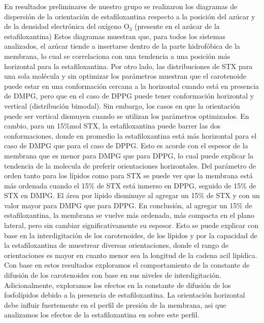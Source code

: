 \documentclass[12pt]{article}
\begin{document}
En resultados preliminares de nuestro grupo se realizaron los diagramas de dispersi\'{o}n de la orientaci\'{o}n de estafiloxantina respecto a la posici\'{o}n del az\'{u}car y de la densidad electr\'{o}nica del ox\'{i}geno $\mathrm{O}_3$ (presente en el az\'{u}car de la estafiloxantina) Estos diagramas muestran que, para todos los sistemas analizados, el az\'{u}car tiende a insertarse dentro de la parte hidrof\'{o}bica de la membrana, lo cual se correlaciona con una tendencia a una posici\'{o}n m\'{a}s horizontal para la estafiloxantina. Por otro lado, las distribuciones de STX para una sola mol\'{e}cula y sin optimizar los par\'{a}metros muestran que el carotenoide puede estar en una conformaci\'{o}n cercana a la horizontal cuando est\'{a} en presencia de DMPG, pero que en el caso de DPPG puede tener conformaci\'{o}n horizontal y vertical (distribuci\'{o}n bimodal). Sin embargo, los casos en que la orientaci\'{o}n puede ser vertical dismuyen cuando se utilizan los par\'{a}metros optimizados. En cambio, para un 15\%mol STX, la estafiloxantina puede barrer las dos conformaciones, donde en promedio la estafiloxantina est\'{a} m\'{a}s horizontal para el caso de DMPG que para el caso de DPPG. Esto es acorde con el espesor de la membrana que es menor para DMPG que para DPPG, lo cual puede explicar la tendencia de la molecula de preferir orientaciones horizontales. Del par\'{a}metro de orden tanto para los l\'{i}pidos como para STX se puede ver que la membrana est\'{a} m\'{a}s ordenada cuando el 15\% de STX est\'{a} inmerso en DPPG, seguido de 15\% de STX en DMPG. El \'{a}rea por l\'{i}pido disminuye al agregar un 15\% de STX y con un valor mayor para DMPG que para DPPG. En conclusi\'{o}n, al agregar un 15\% de estafiloxantina, la membrana se vuelve m\'{a}s ordenada, m\'{a}s compacta en el plano lateral, pero sin cambiar significativamente su espesor. Esto se puede explicar con base en la interdigitaci\'{o}n de los carotenoides, de los l\'{i}pidos y por la capacidad de la estafiloxantina de muestrear diversas orientaciones, donde el rango de orientaciones es mayor en cuanto menor sea la longitud de la cadena acil lip\'{i}dica. Con base en estos resultados exploramos el comportamiento de la constante de difusi\'{o}n de los carotenoides con base en sus niveles de interdigitaci\'{o}n. Adicionalmente, exploramos los efectos en la constante de difusi\'{o}n de los fosfol\'{i}pidos debido a la presencia de estafiloxantina. La orientaci\'{o}n horizontal debe influir fuertemente en el perfil de presi\'{o}n de la membrana, asi que analizamos los efectos de la estafiloxantina en sobre este perfil.\\[2.0cm]
\end{document}
